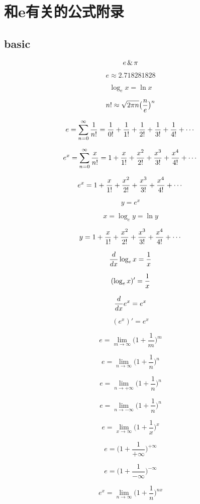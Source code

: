 
\chapter{和e有关的公式附录}

\section{basic}

$$  e \hspace{0.05cm} \& \hspace{0.05cm}  \pi $$

$$ e \approx  2.718281828 $$

$$ \log_ex = \ln x  $$

$$ n! \approx \sqrt{2\pi n}\big({n \over e}\big)^n $$

$$ e = \sum_{n=0}^\infty {1\over n!} = {1\over 0!} + {1 \over 1!} + {1\over 2!} + {1 \over 3!} + {1 \over 4!} + \cdots $$

$$ e^x = \sum_{n=0}^\infty {x\over n!} = 1 + {x \over 1!} + {x^2\over 2!} + {x^3 \over 3!} + {x^4 \over 4!}  + \cdots $$

$$ e^x = 1 + {x \over 1!} + {x^2\over 2!} + {x ^3\over 3!} + {x ^4\over 4!}  + \cdots $$

$$  y=e^x $$  

$$  x= \log_e y = \ln y $$

$$ y = 1 + {x \over 1!} + {x^2\over 2!} + {x ^3\over 3!} + {x ^4\over 4!}  + \cdots $$



$$ {d \over dx} \log_e x = {1 \over x} $$

$$ ( \log_e x)'  = {1 \over x} $$

$$ {d \over dx} e^x = e^x $$

$$  (e^x)' = e^x $$

$$ e = \lim_{m\rightarrow \infty} \big(1+\frac{1}{m}\big)^m $$

$$ e = \lim_{n\rightarrow \infty} \big(1+\frac{1}{n}\big)^n $$


$$ e = \lim_{n\rightarrow +\infty} \big(1+\frac{1}{n}\big)^n $$

$$ e = \lim_{n\rightarrow -\infty} \big(1+\frac{1}{n}\big)^n $$


$$ e = \lim_{x \rightarrow \infty} \big(1+\frac{1}{x}\big)^x $$

$$ e =  \big(1+\frac{1}{+\infty }\big)^{+\infty} $$

$$ e =  \big(1+\frac{1}{-\infty }\big)^{-\infty} $$


$$ e^x = \lim_{n\rightarrow \infty} \big(1+\frac{1}{n}\big)^{nx} $$


